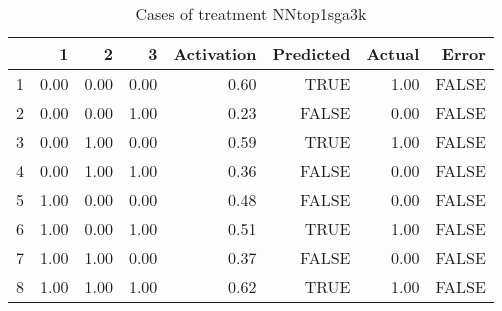 \begin{table}[ht]
\centering
\begin{tabular}{rrrrrrrr}
  \hline
 & 1 & 2 & 3 & Activation & Predicted & Actual & Error \\ 
  \hline
1 & 0.00 & 0.00 & 0.00 & 0.60 & TRUE & 1.00 & FALSE \\ 
  2 & 0.00 & 0.00 & 1.00 & 0.23 & FALSE & 0.00 & FALSE \\ 
  3 & 0.00 & 1.00 & 0.00 & 0.59 & TRUE & 1.00 & FALSE \\ 
  4 & 0.00 & 1.00 & 1.00 & 0.36 & FALSE & 0.00 & FALSE \\ 
  5 & 1.00 & 0.00 & 0.00 & 0.48 & FALSE & 0.00 & FALSE \\ 
  6 & 1.00 & 0.00 & 1.00 & 0.51 & TRUE & 1.00 & FALSE \\ 
  7 & 1.00 & 1.00 & 0.00 & 0.37 & FALSE & 0.00 & FALSE \\ 
  8 & 1.00 & 1.00 & 1.00 & 0.62 & TRUE & 1.00 & FALSE \\ 
   \hline
\end{tabular}
\caption{Cases of treatment NNtop1sga3k} 
\end{table}
